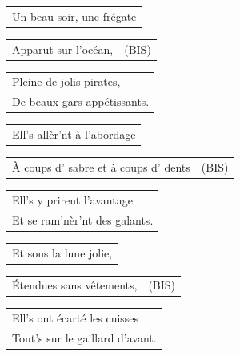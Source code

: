 \documentclass{article}
\begin{document}
\begin{flushleft}
\begin{tabularx}{\textwidth} {
    >{\raggedright\arraybackslash}X}
Un beau soir, une frégate\\
\end{tabularx}
\begin{tabularx}{\textwidth} {
    >{\raggedright\arraybackslash}X|c}
Apparut sur l’océan, & (BIS)\\
\end{tabularx}
\begin{tabularx}{\textwidth} {
    >{\raggedright\arraybackslash}X}
Pleine de jolis pirates, \\
De beaux gars appétissants.\\
\end{tabularx}
\end{flushleft}
\begin{flushleft}
\begin{tabularx}{\textwidth} {
    >{\raggedright\arraybackslash}X}
Ell’s allèr’nt à l’abordage\\
\end{tabularx}
\begin{tabularx}{\textwidth} {
    >{\raggedright\arraybackslash}X|c}
À coups d’ sabre et à coups d’ dents & (BIS)\\
\end{tabularx}
\begin{tabularx}{\textwidth} {
    >{\raggedright\arraybackslash}X}
Ell’s y prirent l’avantage \\
Et se ram’nèr’nt des galants.\\
\end{tabularx}
\end{flushleft}
\begin{flushleft}
\begin{tabularx}{\textwidth} {
    >{\raggedright\arraybackslash}X}
Et sous la lune jolie,\\
\end{tabularx}
\begin{tabularx}{\textwidth} {
    >{\raggedright\arraybackslash}X|c}
Étendues sans vêtements, & (BIS)\\
\end{tabularx}
\begin{tabularx}{\textwidth} {
    >{\raggedright\arraybackslash}X}
Ell’s ont écarté les cuisses\\
Tout’s sur le gaillard d’avant.\\
\end{tabularx}
\end{flushleft}
\end{document}
